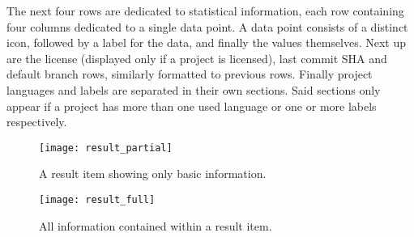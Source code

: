 The next four rows are dedicated to statistical information, each row containing four columns dedicated to a single data point.
A data point consists of a distinct icon, followed by a label for the data, and finally the values themselves.
Next up are the license (displayed only if a project is licensed), last commit SHA and default branch rows, similarly formatted to previous rows.
Finally project languages and labels are separated in their own sections.
Said sections only appear if a project has more than one used language or one or more labels respectively.

\begin{figure}[ht!]
    \centering
    \texttt{[image: result\_partial]}
    \caption[Result item partial]{A result item showing only basic information.}
    \label{fig:9}
\end{figure}

\begin{figure}[ht!]
    \centering
    \texttt{[image: result\_full]}
    \caption[Result item full]{All information contained within a result item.}
    \label{fig:10}
\end{figure}